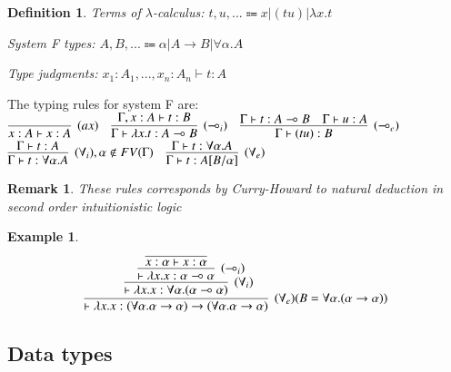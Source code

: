 \documentclass[a4paper,10pt]{article}
\newcommand{\impl}{\rightarrow}	%
\newcommand{\limpl}{\multimap}  %
\newtheorem{definition}{Definition}
\newtheorem{ex}{Example}
\newtheorem{rmk}{Remark}
\begin{document}
\begin{definition}
\item Terms of $\lambda$-calculus: $t,u,... \Coloneqq x | (t u) | \lambda x.t$
\item System F types: $A,B,... \Coloneqq \alpha | A\impl B | \forall \alpha .A $
\item Type judgments: $x_1:A_1, ..., x_n:A_n \vdash t:A$
\end{definition}

\par The typing rules for system F are:
$	\infer[(ax)]{x:A \vdash x:A}{} \quad
	\infer[(\limpl_i)]{\Gamma \vdash \lambda x.t : A \limpl B}{\Gamma, x:A \vdash t:B} \quad
	\infer[(\limpl_e)]{\Gamma \vdash (t u) : B}{\Gamma \vdash t : A \limpl B & \Gamma \vdash u : A }$\\
\vspace{0.2cm}
$	\infer[(\forall_i), \alpha \notin FV(\Gamma)]{\Gamma \vdash t:\forall \alpha.A}{\Gamma \vdash t:A} \quad
	\infer[(\forall_e)]{\Gamma \vdash t:A[B/\alpha]}{\Gamma \vdash t:\forall \alpha.A}
$

\begin{rmk}
These rules corresponds by Curry-Howard to natural deduction in second order intuitionistic logic
\end{rmk}

\begin{ex}
$$ \infer[(\forall_e) (B=\forall \alpha.(\alpha \impl \alpha))]{\vdash \lambda x. x: (\forall \alpha. \alpha \impl \alpha) \impl (\forall \alpha. \alpha \impl \alpha)}
	{
	\infer[(\forall_i)]{\vdash \lambda x.x : \forall \alpha.(\alpha \limpl \alpha)}
		{
		\infer[(\limpl_i)]{\vdash \lambda x.x : \alpha \limpl \alpha}
			{
				\infer{x:\alpha \vdash x:\alpha}{}
			}
		}
	}$$
\end{ex}



\subsection{Data types}
\end{document}
